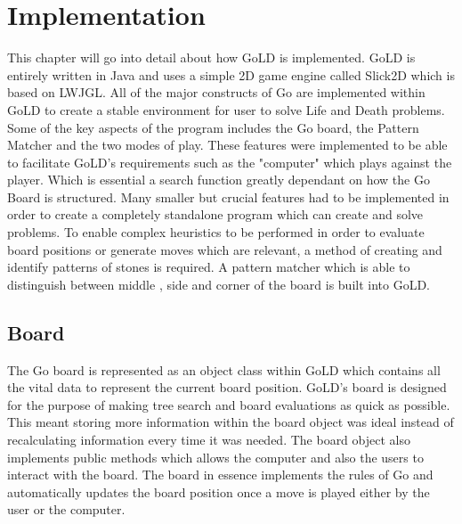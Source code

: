 \documentclass{l4proj}
\begin{document}
\chapter{Implementation}
This chapter will go into detail about how GoLD is implemented. GoLD is entirely written in Java and uses a simple 2D game engine called Slick2D which is based on LWJGL. All of the major constructs of Go are implemented within GoLD to create a stable environment for user to solve Life and Death problems. Some of the key aspects of the program includes the Go board, the Pattern Matcher and the two modes of play. These features were implemented to be able to facilitate GoLD's requirements such as the "computer" which plays against the player. Which is essential a search function greatly dependant on how the Go Board is structured. Many smaller but crucial features had to be implemented in order to create a completely standalone program which can create and solve problems. To enable complex heuristics to be performed in order to evaluate board positions or generate moves which are relevant, a method of creating and identify patterns of stones is required. A pattern matcher which is able to distinguish between middle , side and corner of the board is built into GoLD.

\section{Board}

The Go board is represented as an object class within GoLD which contains all the vital data to represent the current board position. GoLD's board is designed for the purpose of making tree search and board evaluations as quick as possible. This meant storing more information within the board object was ideal  instead of recalculating information every time it was needed. The board object also implements public methods which allows the computer and also the users to interact with the board. The board in essence implements the rules of Go and automatically updates the board position once a move is played either by the user or the computer.
\end{document}
